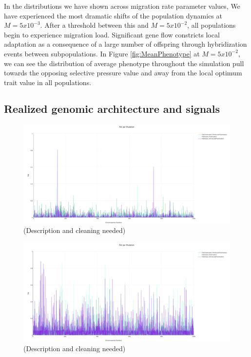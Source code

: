 \documentclass{article}
\begin{document}

In the distributions we have shown across migration rate parameter values, 
We have experienced the most dramatic shifts of the population dynamics at $M = 5x10^{-3}$.
After a threshold between this and $M = 5x10^{-2}$, all populations begin to experience migration load. 
Significant gene flow constricts local adaptation
as a consequence of a large number of offspring through hybridization events between subpopulations.
In Figure \ref{fig:MeanPhenotype} at $M = 5x10^{-2}$, we can see the distribution of average phenotype throughout the simulation
pull towards the opposing selective pressure value and away from the local optimum trait value in all populations.



\subsection*{Realized genomic architecture and signals}


\begin{figure}
	\begin{center}
  		\includegraphics[width=0.7\linewidth]{plotlyPlots/FstAcross5e-3.png}
  		\caption{(Description and cleaning needed)
		}
  		\label{fig:Fst3}
	\end{center}
\end{figure}

\begin{figure}
	\begin{center}
  		\includegraphics[width=0.7\linewidth]{plotlyPlots/FstAcross5e-4.png}
  		\caption{(Description and cleaning needed)
		}
  		\label{fig:Fst2}
	\end{center}
\end{figure}
\end{document}
